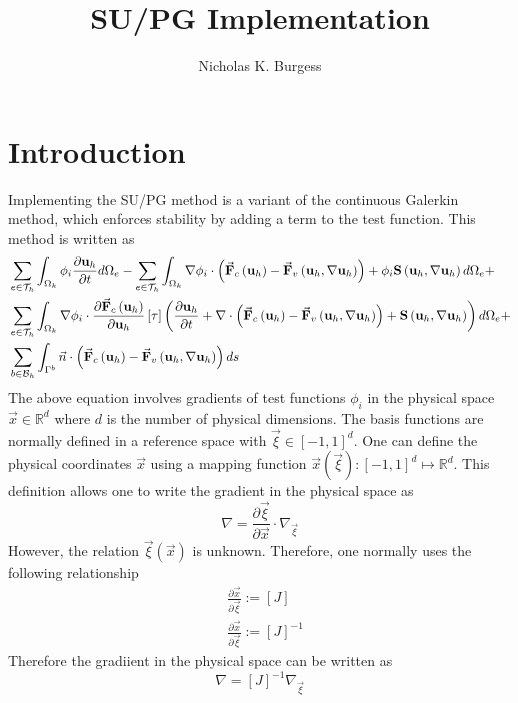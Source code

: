 \documentclass[letterpaper]{article}
\title{SU/PG Implementation}
\author{Nicholas K. Burgess}
\newcommand{\pd}[2]{\frac{ \partial #1}{\partial #2}}
\newcommand{\volint}[1]{ \sum_{e \in \mathcal{T}_{h}}\int_{\Omega_k} #1 d\Omega_{e} }
\newcommand{\bsurfint}[1]{\sum_{b\in \mathcal{B}_{h}}\int_{\Gamma^{b}} #1 ds}
\newcommand{\paren}[1]{\left( #1 \right)}
\newcommand{\sparen}[1]{\left[ #1 \right]}
\newcommand{\hb}[1]{ {\bf #1}_{h} } %
\newcommand{\fc}{\vec{{\bf F}}_{c} \paren{\hb{u}}   }
\newcommand{\fv}{\vec{{\bf F}}_{v} \paren{\hb{u},\nabla \hb{u}} }
\begin{document}
\maketitle

\section{Introduction}
Implementing the SU/PG method is a variant of the continuous Galerkin method, which enforces stability by adding a term to the test function.  This method is written as 
\begin{equation}\label{eq:weaksupg}
 \begin{split}
& \volint{\phi_{i}\pd{\hb{u}}{t} } - \volint{\nabla \phi_{i} \cdot \left( \fc - \fv \right)  + \phi_{i} {\bf S}\paren{ \hb{u}, \nabla \hb{u} } }+ \\
& \volint{ \nabla \phi_{i}\cdot \pd{ \vec{ {\bf F}}_{c}\paren{\hb{u} }  }{\hb{u} }\sparen{\tau} 
\paren{ \pd{\hb{u}}{t} + \nabla \cdot \paren{ \fc - \fv }  +  {\bf S}\paren{  \hb{u}, \nabla \hb{u} }}  } + \\ 
& \bsurfint{ \vec{n} \cdot  \paren{\fc - \fv } }
\end{split}
\end{equation}
The above equation involves gradients of test functions $\phi_{i}$ in the physical space $\vec{x} \in \mathbb{R}^{d}$ where $d$ is the number of physical dimensions.  The basis functions are normally defined in a reference space with $\vec{\xi} \in [-1,1]^{d}$.  One can define the physical coordinates $\vec{x}$ using a mapping function $\vec{x} \paren{\vec{\xi}} : [-1,1]^{d} \mapsto \mathbb{R}^{d}$.  This definition allows one to write the gradient in the physical space as 
\begin{equation}
\nabla = \pd{\vec{\xi} }{\vec{x}} \cdot \nabla_{\vec{\xi}}
\end{equation}
However, the relation $\vec{\xi}(\vec{x})$ is unknown.  Therefore, one normally uses the following relationship
\begin{equation}
\begin{split}
& \pd{\vec{x}}{\vec{\xi}} :=\sparen{J} \\
& \pd{\vec{x}}{\vec{\xi}}:= \sparen{J}^{-1} 
\end{split}
\end{equation}
Therefore the gradiient in the physical space can be written as
\begin{equation}
\nabla = \sparen{J}^{-1} \nabla_{\vec{\xi}}
\end{equation}
\end{document}
